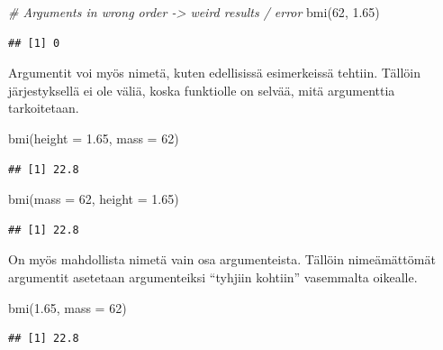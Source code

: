\documentclass[
]{book}
\newenvironment{Shaded}{\begin{snugshade}}{\end{snugshade}}
\newcommand{\AttributeTok}[1]{\textcolor[rgb]{0.77,0.63,0.00}{#1}}
\newcommand{\CommentTok}[1]{\textcolor[rgb]{0.56,0.35,0.01}{\textit{#1}}}
\newcommand{\DecValTok}[1]{\textcolor[rgb]{0.00,0.00,0.81}{#1}}
\newcommand{\FloatTok}[1]{\textcolor[rgb]{0.00,0.00,0.81}{#1}}
\newcommand{\FunctionTok}[1]{\textcolor[rgb]{0.00,0.00,0.00}{#1}}
\newcommand{\NormalTok}[1]{#1}
\begin{document}
\begin{Shaded}
\begin{Highlighting}[]
\CommentTok{\# Arguments in wrong order {-}\textgreater{} weird results / error}
\FunctionTok{bmi}\NormalTok{(}\DecValTok{62}\NormalTok{, }\FloatTok{1.65}\NormalTok{)}
\end{Highlighting}
\end{Shaded}

\begin{verbatim}
## [1] 0
\end{verbatim}

Argumentit voi myös nimetä, kuten edellisissä esimerkeissä tehtiin. Tällöin järjestyksellä ei ole väliä, koska funktiolle on selvää, mitä argumenttia tarkoitetaan.

\begin{Shaded}
\begin{Highlighting}[]
\FunctionTok{bmi}\NormalTok{(}\AttributeTok{height =} \FloatTok{1.65}\NormalTok{, }\AttributeTok{mass =} \DecValTok{62}\NormalTok{)}
\end{Highlighting}
\end{Shaded}

\begin{verbatim}
## [1] 22.8
\end{verbatim}

\begin{Shaded}
\begin{Highlighting}[]
\FunctionTok{bmi}\NormalTok{(}\AttributeTok{mass =} \DecValTok{62}\NormalTok{, }\AttributeTok{height =} \FloatTok{1.65}\NormalTok{)}
\end{Highlighting}
\end{Shaded}

\begin{verbatim}
## [1] 22.8
\end{verbatim}

On myös mahdollista nimetä vain osa argumenteista. Tällöin nimeämättömät argumentit asetetaan argumenteiksi ``tyhjiin kohtiin'' vasemmalta oikealle.

\begin{Shaded}
\begin{Highlighting}[]
\FunctionTok{bmi}\NormalTok{(}\FloatTok{1.65}\NormalTok{, }\AttributeTok{mass =} \DecValTok{62}\NormalTok{)}
\end{Highlighting}
\end{Shaded}

\begin{verbatim}
## [1] 22.8
\end{verbatim}
\end{document}
